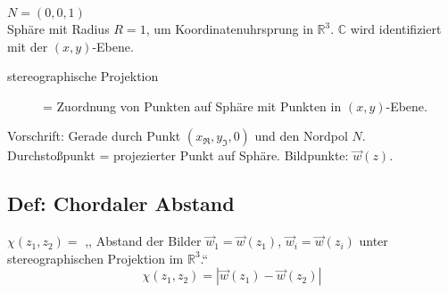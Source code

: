 \begin{description}
\begin{enumerate}[1.]
		
		
		\noindent
		$ N = (0,0,1) $\\
		Sphäre mit Radius $ R = 1 $, um Koordinatenuhrsprung in $ \mathbb{R}^3 $. $ \mathbb{C} $ wird identifiziert mit der $ (x,y) $-Ebene.
		\begin{description}
			\item[stereographische Projektion] = Zuordnung von Punkten auf Sphäre mit Punkten in $ (x,y) $-Ebene.
		\end{description}
		Vorschrift: Gerade durch Punkt $ (x_{\Re}, y_{\Im}, 0) $ und den Nordpol $ N $. Durchstoßpunkt = projezierter Punkt auf Sphäre. Bildpunkte: $ \vec{w}(z) $.
		
		\subsection*{Def: Chordaler Abstand}
		
		$ \chi(z_1, z_2) = $ ,, Abstand der Bilder $ \vec{w}_1 = \vec{w}(z_1) $, $ \vec{w}_i = \vec{w}(z_i) $ unter stereographischen Projektion im $ \mathbb{R}^3 $.``
		\begin{equation*}
		\chi (z_1, z_2) = |\vec{w}(z_1) - \vec{w}(z_2)|
		\end{equation*}
		
		
	\end{enumerate}
\end{description}

